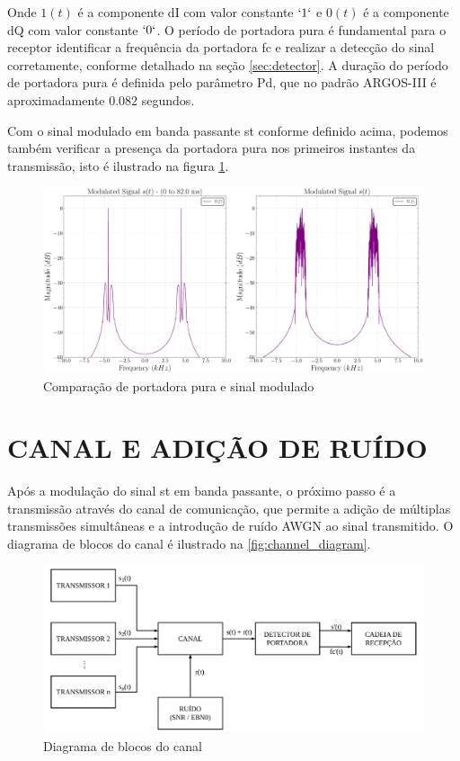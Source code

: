 \noindent Onde $1(t)$ é a componente \gls{dI} com valor constante $`1`$ e $0(t)$ é a componente \gls{dQ} com valor constante $`0`$. O período de portadora pura é fundamental para o receptor identificar a frequência da portadora \gls{fc} e realizar a detecção do sinal corretamente, conforme detalhado na seção \ref{sec:detector}. A duração do período de portadora pura é definida pelo parâmetro \gls{Pd}, que no padrão \gls{ARGOS-III} é aproximadamente $0.082$ segundos.

Com o sinal modulado em banda passante \gls{st} conforme definido acima, podemos também verificar a presença da portadora pura nos primeiros instantes da transmissão, isto é ilustrado na figura \ref{fig:transmitter_modulator_portadora}.

\begin{figure}[H]
	\centering
	\caption{Comparação de portadora pura e sinal modulado}\label{fig:transmitter_modulator_portadora}
	\includegraphics[width=\linewidth]{assets/cap3/transmitter_modulator_portadora.pdf}
\end{figure}

\section{CANAL E ADIÇÃO DE RUÍDO}\label{sec:canal}


Após a modulação do sinal \gls{st} em banda passante, o próximo passo é a transmissão através do canal de comunicação, que permite a adição de múltiplas transmissões simultâneas e a introdução de ruído \gls{AWGN} ao sinal transmitido. O diagrama de blocos do canal é ilustrado na \autoref{fig:channel_diagram}.

\begin{figure}[H]
	\centering
	\caption{Diagrama de blocos do canal}\label{fig:channel_diagram}
	\includegraphics[width=\linewidth]{assets/diagrams/channel.pdf}
\end{figure}

